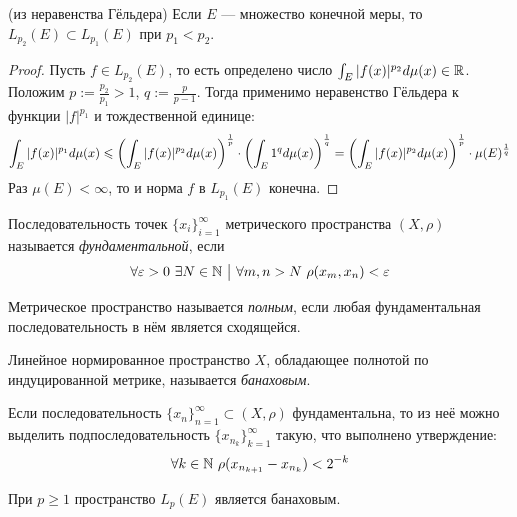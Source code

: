 \begin{corollary} (из неравенства Гёльдера)
	Если $E$ --- множество конечной меры, то $L_{p_2}(E) \subset L_{p_1}(E)$ при $p_1 < p_2$.
\end{corollary}

\begin{proof}
	Пусть $f \in L_{p_2}(E)$, то есть определено число $\int_E |f(x)|^{p_2} d\mu(x) \in \mathbb{R}$. Положим $p := \frac{p_2}{p_1} > 1$, $q := \frac{p}{p-1}$. Тогда применимо неравенство Гёльдера к функции $|f|^{p_1}$ и тождественной единице:
	\[
		\int_E |f(x)|^{p_1} d\mu(x) \leqslant \left(\int_E |f(x)|^{p_2} d\mu(x)\right)^{\frac{1}{p}} \cdot \left(\int_E 1^q d\mu(x)\right)^{\frac{1}{q}} = \left(\int_E |f(x)|^{p_2} d\mu(x)\right)^{\frac{1}{p}} \cdot \mu(E)^{\frac{1}{q}}
	\]
	Раз $\mu(E) < \infty$, то и норма $f$ в $L_{p_1}(E)$ конечна.
\end{proof}

\begin{reminder}
	Последовательность точек $\{x_i\}_{i=1}^\infty$ метрического пространства $(X, \rho)$ называется \textit{фундаментальной}, если
	\[
		\forall \varepsilon > 0 \ \exists N \in \mathbb{N} \ \big|\  \forall m, n > N \ \rho(x_m, x_n) < \varepsilon
	\]
\end{reminder}

\begin{reminder}
	Метрическое пространство называется \textit{полным}, если любая фундаментальная последовательность в нём является сходящейся.
\end{reminder}

\begin{reminder}
Линейное нормированное пространство $X$, обладающее полнотой по индуцированной метрике, называется \textit{банаховым}.
\end{reminder}

\begin{exercise}
Если последовательность $\{x_n\}_{n = 1}^\infty \subset (X, \rho)$ фундаментальна, то из неё можно выделить подпоследовательность $\{x_{n_k}\}_{k = 1}^\infty$ такую, что выполнено утверждение:
\[
	\forall k \in \mathbb{N}\ \rho(x_{n_{k + 1}} - x_{n_k}) < 2^{-k}
\]
\end{exercise}

\begin{theorem}
	При $p \ge 1$ пространство $L_p(E)$ является банаховым.
\end{theorem}

